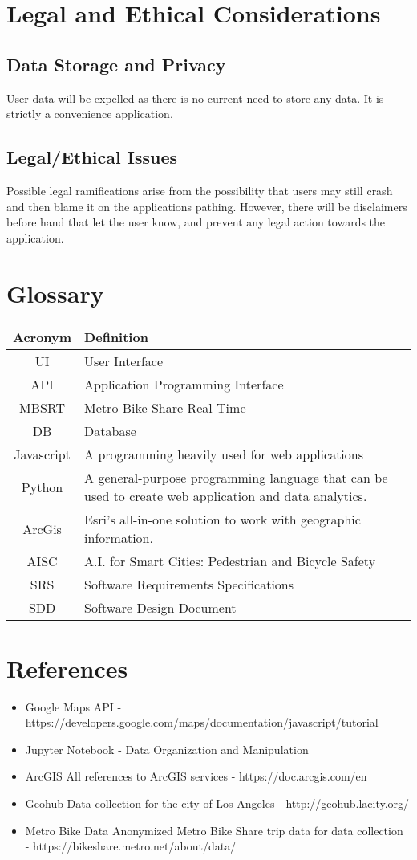 \documentclass[a4paper,12pt]{article}
\begin{document}
\section{Legal and Ethical Considerations}
\subsection{Data Storage and Privacy}
User data will be expelled as there is no current need to store any data. It is strictly a convenience application.
\subsection{Legal/Ethical Issues}
Possible legal ramifications arise from the possibility that users may still crash and then blame it on the applications pathing. However, there will be disclaimers before hand that let the user know, and prevent any legal action towards the application.

\section{Glossary}
\begin{longtable}{|c|p{10cm}|}
\hline
\textbf{Acronym} & \textbf{Definition} \\
\hline
UI & User Interface \\
API & Application Programming Interface \\
MBSRT & Metro Bike Share Real Time \\
DB & Database \\
Javascript & A programming heavily used for web applications\\
Python & A general-purpose programming language that can be used to create web application and data analytics.\\
ArcGis & Esri’s all-in-one solution to work with geographic information.\\
AISC & A.I. for Smart Cities: Pedestrian and Bicycle Safety \\
SRS & Software Requirements Specifications \\
SDD & Software Design Document \\


\hline
\end{longtable}

\section{References}
\begin{itemize}
    \item Google Maps API - https://developers.google.com/maps/documentation/javascript/tutorial
    \item Jupyter Notebook - Data Organization and Manipulation
    \item ArcGIS All references to ArcGIS services - https://doc.arcgis.com/en
    \item Geohub Data collection for the city of Los Angeles - http://geohub.lacity.org/
    \item Metro Bike Data Anonymized Metro Bike Share trip data for data collection - https://bikeshare.metro.net/about/data/
\end{itemize}
\end{document}
